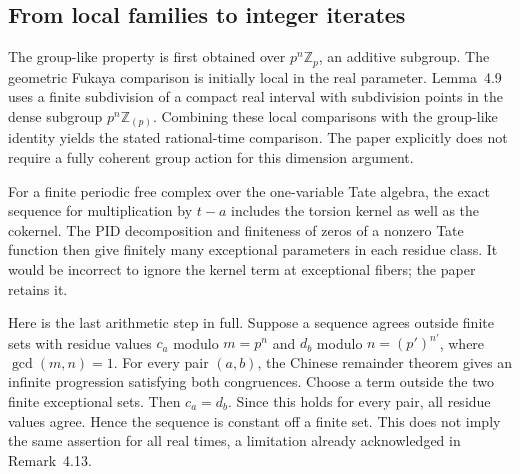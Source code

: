 \documentclass[10pt]{article}
\begin{document}
\subsection*{From local families to integer iterates}
The group-like property is first obtained over \(p^n\mathbb Z_p\), an additive subgroup. The geometric Fukaya comparison is initially local in the real parameter. Lemma 4.9 uses a finite subdivision of a compact real interval with subdivision points in the dense subgroup \(p^n\mathbb Z_{(p)}\). Combining these local comparisons with the group-like identity yields the stated rational-time comparison. The paper explicitly does not require a fully coherent group action for this dimension argument.\par
For a finite periodic free complex over the one-variable Tate algebra, the exact sequence for multiplication by \(t-a\) includes the torsion kernel as well as the cokernel. The PID decomposition and finiteness of zeros of a nonzero Tate function then give finitely many exceptional parameters in each residue class. It would be incorrect to ignore the kernel term at exceptional fibers; the paper retains it.\par
Here is the last arithmetic step in full. Suppose a sequence agrees outside finite sets with residue values \(c_a\) modulo \(m=p^n\) and \(d_b\) modulo \(n=(p')^{n'}\), where \(\gcd(m,n)=1\). For every pair \((a,b)\), the Chinese remainder theorem gives an infinite progression satisfying both congruences. Choose a term outside the two finite exceptional sets. Then \(c_a=d_b\). Since this holds for every pair, all residue values agree. Hence the sequence is constant off a finite set. This does not imply the same assertion for all real times, a limitation already acknowledged in Remark 4.13.\par
\end{document}
